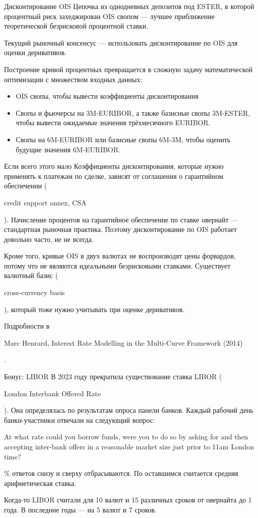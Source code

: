 \documentclass{beamer}
\newcommand{\en}[1]{\begin{otherlanguage}{english}#1\end{otherlanguage}}
\begin{document}
\begin{frame}{Дисконтирование OIS}
\justify
Цепочка из однодневных депозитов под ESTER, в которой процентный риск захеджирован OIS свопом --- лучшее приближение теоретической безрисковой процентной ставки.

\justify
Текущий рыночный консенсус --- использовать дисконтирование по OIS для оценки деривативов.

\justify
Построение кривой процентных превращается в сложную задачу математической оптимизации с множеством входных данных:
\begin{itemize}
\item OIS свопы, чтобы вывести коэффициенты дисконтирования
\item Свопы и фьючерсы на 3M-EURIBOR, а также базисные свопы 3M-ESTER, чтобы вывести ожидаемые значения трёхмесячного EURIBOR.
\item Свопы на 6M-EURIBOR или базисные свопы 6M-3M, чтобы оценить будущие значения 6M-EURIBOR.
\end{itemize}
\end{frame}



\begin{frame}{Если всего этого мало}
\justify
Коэффициенты дисконтирования, которые нужно применять к платежам по сделке, зависят от соглашения о гарантийном обеспечении (\en{credit support annex, CSA}). Начисление процентов на гарантийное обеспечение по ставке овернайт --- стандартная рыночная практика. Поэтому дисконтирование по OIS работает довольно часто, не не всегда.

\justify
Кроме того, кривые OIS в двух валютах не воспроизводят цены форвардов, потому что не являются идеальными безрисковыми ставками. Существует валютный базис (\en{cross-currency basis}), который тоже нужно учитывать при оценке деривативов.

\justify
Подробности в \en{Marc Henrard, Interest Rate Modelling in the Multi-Curve Framework (2014)}.
\end{frame}



\begin{frame}{Бонус: LIBOR}
\justify
В 2023 году прекратила существование ставка LIBOR (\en{London Interbank Offered Rate}). Она определялась по результатам опроса панели банков. Каждый рабочий день банки-участники отвечали на следующий вопрос:

\justify
\en{At what rate could you borrow funds, were you to do so by asking for and then accepting inter-bank offers in a reasonable market size just prior to 11am London time?}

\% ответов снизу и сверху отбрасываются. По оставшимся считается средняя арифметическая ставка.

\justify
Когда-то LIBOR считали для 10 валют и 15 различных сроков от овернайта до 1 года. В последние годы --- на 5 валют и 7 сроков.
\end{frame}
\end{document}
